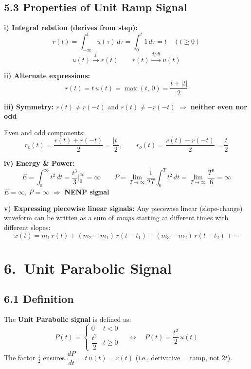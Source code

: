 \documentclass[10pt,a4paper]{article}
\begin{document}
\subsection*{5.3 Properties of Unit Ramp Signal}

\begin{propbox}
\textbf{i) Integral relation (derives from step):}
\[
r(t) = \int_{-\infty}^{t}u(\tau)\,d\tau = \int_{0}^{t}1\,d\tau = t \quad (t \geq 0)
\]
\[
u(t) \xrightarrow{\int} r(t) \qquad r(t) \xrightarrow{d/dt} u(t)
\]

\textbf{ii) Alternate expressions:}
\[
r(t) = t\,u(t) = \max(t,\, 0) = \frac{t + |t|}{2}
\]

\textbf{iii) Symmetry:} $r(t) \neq r(-t)$ and $r(t) \neq -r(-t)$ $\Rightarrow$ \textbf{neither even nor odd}

Even and odd components:
\[
r_e(t) = \frac{r(t)+r(-t)}{2} = \frac{|t|}{2}, \qquad r_o(t) = \frac{r(t)-r(-t)}{2} = \frac{t}{2}
\]

\textbf{iv) Energy \& Power:}
\[
E = \int_{0}^{\infty}t^2\,dt = \frac{t^3}{3}\bigg|_0^\infty = \infty \qquad P = \lim_{T\to\infty}\frac{1}{2T}\int_{0}^{T}t^2\,dt = \lim_{T\to\infty}\frac{T^2}{6} = \infty
\]
$E = \infty$, $P = \infty$ $\Rightarrow$ \textbf{NENP signal}

\textbf{v) Expressing piecewise linear signals:}
Any piecewise linear (slope-change) waveform can be written as a sum of \emph{ramps} starting at different times with different slopes:
\[
x(t) = m_1\,r(t) + (m_2-m_1)\,r(t-t_1) + (m_3-m_2)\,r(t-t_2) + \cdots
\]
\end{propbox}

\section{6.\ Unit Parabolic Signal}

\subsection*{6.1 Definition}

\begin{rampbox}
The \textbf{Unit Parabolic signal} is defined as:
\[
P(t) = \begin{cases}0 & t < 0\\ \dfrac{t^2}{2} & t \geq 0\end{cases}
\quad\Leftrightarrow\quad P(t) = \frac{t^2}{2}\,u(t)
\]
The factor $\tfrac{1}{2}$ ensures $\dfrac{dP}{dt} = t\,u(t) = r(t)$ (i.e., derivative = ramp, not $2t$).
\end{rampbox}
\end{document}
